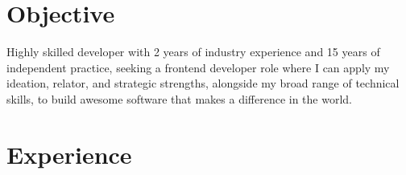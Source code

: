 \documentclass[11pt, a4paper]{article}
\begin{document}


\section*{Objective}
\vspace{-0.05in}
\hspace*{0.04in}
\begin{minipage}{0.97\textwidth}
  Highly skilled developer with 2 years of industry experience and 15 years of
  independent practice, seeking a frontend developer role where I can apply my
  ideation, relator, and strategic strengths, alongside my broad range of technical
  skills, to build awesome software that makes a difference in the world.
\end{minipage}
\vspace{-0.15in}

\section*{Experience}
\vspace{-0.05in}


\noindent
{
  \hfill
}
\end{document}
